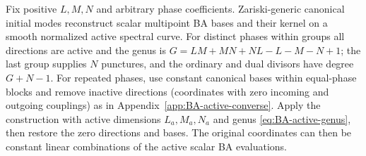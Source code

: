 \begin{theorem}\label{thm:BA-spectral-converse}
Fix positive $L,M,N$ and arbitrary phase coefficients. Zariski-generic
canonical initial modes reconstruct scalar multipoint BA bases and
their kernel on a smooth normalized active spectral curve.
For distinct phases within groups all directions are active and the
genus is $G=LM+MN+NL-L-M-N+1$; the last group supplies $N$
punctures, and the ordinary and dual divisors have degree $G+N-1$.
For repeated phases, use constant canonical bases within equal-phase
blocks and remove inactive directions (coordinates with zero incoming
and outgoing couplings) as in
Appendix~\ref{app:BA-active-converse}. Apply the construction with
active dimensions $L_a,M_a,N_a$ and genus
\cref{eq:BA-active-genus}, then restore the zero directions and bases.
The original coordinates can then be constant linear combinations
of the active scalar BA evaluations.
\end{theorem}
